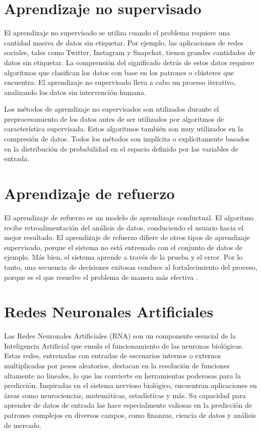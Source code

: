 \section{Aprendizaje no supervisado}

El aprendizaje no supervisado se utiliza cuando el problema requiere una cantidad masiva de datos sin etiquetar. Por ejemplo, las aplicaciones de redes sociales, tales como Twitter, Instagram y Snapchat, tienen grandes cantidades de datos sin etiquetar. La comprensión del significado detrás de estos datos requiere algoritmos que clasifican los datos con base en los patrones o clústeres que encuentra. El aprendizaje no supervisado lleva a cabo un proceso iterativo, analizando los datos sin intervención humana\cite{ibm}.

Los métodos de aprendizaje no supervisados son utilizados durante el preprocesamiento de los datos antes de ser utilizados por algoritmos de característica supervisada. Estos algoritmos también son muy utilizados en la compresión de datos. Todos los métodos son implícita o explícitamente basados en la distribución de probabilidad en el espacio definido por las variables de entrada\cite{de2014aprendizaje}.

\section{Aprendizaje de refuerzo}

El aprendizaje de refuerzo es un modelo de aprendizaje conductual. El algoritmo recibe retroalimentación del análisis de datos, conduciendo el usuario hacia el mejor resultado. El aprendizaje de refuerzo difiere de otros tipos de aprendizaje supervisado, porque el sistema no está entrenado con el conjunto de datos de ejemplo. Más bien, el sistema aprende a través de la prueba y el error. Por lo tanto, una secuencia de decisiones exitosas conduce al fortalecimiento del proceso, porque es el que resuelve el problema de manera más efectiva \cite{ibm}.

\section{Redes Neuronales Artificiales}
Las Redes Neuronales Artificiales (RNA) son un componente esencial de la Inteligencia Artificial que emula el funcionamiento de las neuronas biológicas. Estas redes, entrenadas con entradas de escenarios internos o externos multiplicadas por pesos aleatorios, destacan en la resolución de funciones altamente no lineales, lo que las convierte en herramientas poderosas para la predicción. Inspiradas en el sistema nervioso biológico, encuentran aplicaciones en áreas como neurociencias, matemáticas, estadísticas y más. Su capacidad para aprender de datos de entrada las hace especialmente valiosas en la predicción de patrones complejos en diversos campos, como finanzas, ciencia de datos y análisis de mercado.

